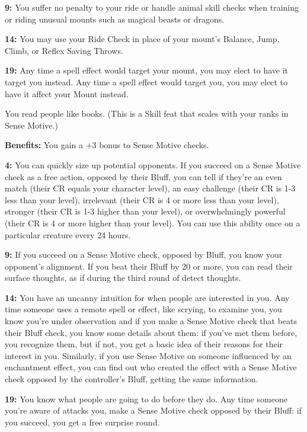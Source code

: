 \textbf{9:} You suffer no penalty to your ride or handle animal skill checks when training or riding unusual mounts such as magical beasts or dragons.

\textbf{14:} You may use your Ride Check in place of your mount's Balance, Jump, Climb, or Reflex Saving Throws.

\textbf{19:} Any time a spell effect would target your mount, you may elect to have it target you instead. Any time a spell effect would target you, you may elect to have it affect your Mount instead.


You read people like books. (This is a Skill feat that scales with your ranks in Sense Motive.)

\textbf{Benefits:} You gain a +3 bonus to Sense Motive checks.

\textbf{4:} You can quickly size up potential opponents. If you succeed on a Sense Motive check as a free action, opposed by their Bluff, you can tell if they're an even match (their CR equals your character level), an easy challenge (their CR is 1-3 less than your level), irrelevant (their CR is 4 or more less than your level), stronger (their CR is 1-3 higher than your level), or overwhelmingly powerful (their CR is 4 or more higher than your level). You can use this ability once on a particular creature every 24 hours.

\textbf{9:} If you succeed on a Sense Motive check, opposed by Bluff, you know your opponent's alignment. If you beat their Bluff by 20 or more, you can read their surface thoughts, as if during the third round of detect thoughts.

\textbf{14:} You have an uncanny intuition for when people are interested in you. Any time someone uses a remote spell or effect, like scrying, to examine you, you know you're under observation and if you make a Sense Motive check that beats their Bluff check, you know some details about them: if you've met them before, you recognize them, but if not, you get a basic idea of their reasons for their interest in you. Similarly, if you use Sense Motive on someone influenced by an enchantment effect, you can find out who created the effect with a Sense Motive check opposed by the controller's Bluff, getting the same information.

\textbf{19:} You know what people are going to do before they do. Any time someone you're aware of attacks you, make a Sense Motive check opposed by their Bluff: if you succeed, you get a free surprise round.

